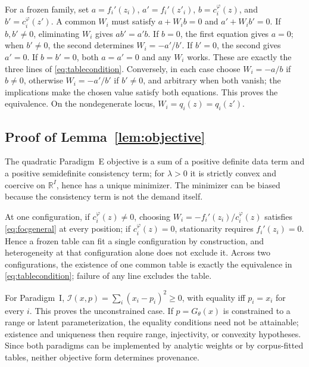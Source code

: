 \documentclass[twoside,11pt]{article}
\begin{document}
For a frozen family, set $a=f_i'(z_i)$, $a'=f_i'(z'_i)$, $b=c_i^\varphi(z)$, and $b'=c_i^\varphi(z')$. A common $W_i$ must satisfy $a+W_i b=0$ and $a'+W_i b'=0$.
If $b,b'\neq0$, eliminating $W_i$ gives $ab'=a'b$. If $b=0$, the first equation gives $a=0$; when $b'\neq0$, the second determines $W_i=-a'/b'$. If $b'=0$, the second gives $a'=0$. If $b=b'=0$, both $a=a'=0$ and any $W_i$ works. These are exactly the three lines of \eqref{eq:tablecondition}. Conversely, in each case choose $W_i=-a/b$ if $b\neq0$, otherwise $W_i=-a'/b'$ if $b'\neq0$, and arbitrary when both vanish; the implications make the chosen value satisfy both equations. This proves the equivalence. On the nondegenerate locus, $W_i=q_i(z)=q_i(z')$.

\subsection{Proof of Lemma~\ref{lem:objective}}
The quadratic Paradigm~E objective is a sum of a positive definite data term and a positive semidefinite consistency term; for $\lambda>0$ it is strictly convex and coercive on $\mathbb{R}^{I}$, hence has a unique minimizer. The minimizer can be biased because the consistency term is not the demand itself.

At one configuration, if $c_i^\varphi(z)\neq0$, choosing $W_i=-f_i'(z_i)/c_i^\varphi(z)$ satisfies \eqref{eq:focgeneral} at every position; if $c_i^\varphi(z)=0$, stationarity requires $f_i'(z_i)=0$. Hence a frozen table can fit a single configuration by construction, and heterogeneity at that configuration alone does not exclude it. Across two configurations, the existence of one common table is exactly the equivalence in \eqref{eq:tablecondition}; failure of any line excludes the table.

For Paradigm~I, $\mathcal{I}(x,p)=\sum_i(x_i-p_i)^2\ge0$, with equality iff $p_i=x_i$ for every $i$. This proves the unconstrained case. If $p=G_\theta(x)$ is constrained to a range or latent parameterization, the equality conditions need not be attainable; existence and uniqueness then require range, injectivity, or convexity hypotheses. Since both paradigms can be implemented by analytic weights or by corpus-fitted tables, neither objective form determines provenance.
\end{document}
